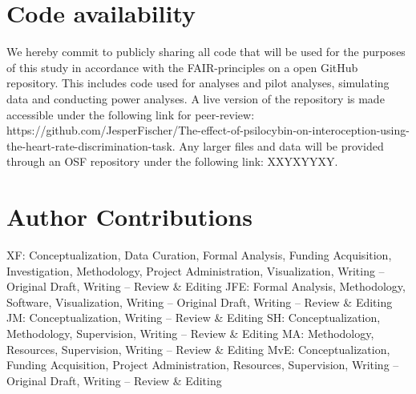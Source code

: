 \documentclass{article}
\begin{document}
\section{Code availability}
\begin{comment}
    For Registered Reports, public sharing of all code upon acceptance for publication of the Stage 2 manuscript is mandatory. Please include a statement committing to sharing all code on acceptance of your Stage 2 manuscript. The Code availability statement must be included separately from the Data availability statement. Please provide a link (e.g. GitHub, osf) to a live version of your code. Code used to simulate data, conduct power analyses, and analyse pilot data should be made accessible in the same location. The code must be made available for peer-review, but can be placed under public embargo until Stage 2 acceptance.
\end{comment}
We hereby commit to publicly sharing all code that will be used for the purposes of this study in accordance with the FAIR-principles on a open GitHub repository. This includes code used for analyses and pilot analyses, simulating data and conducting power analyses. A live version of the repository is made accessible under the following link for peer-review: https://github.com/JesperFischer/The-effect-of-psilocybin-on-interoception-using-the-heart-rate-discrimination-task. Any larger files and data will be provided through an OSF repository under the following link: XXYXYYXY.

\section{Author Contributions}
XF: Conceptualization, Data Curation, Formal Analysis, Funding Acquisition, Investigation, Methodology, Project Administration, Visualization, Writing – Original Draft, Writing – Review \& Editing
JFE: Formal Analysis, Methodology, Software, Visualization, Writing – Original Draft, Writing – Review \& Editing
JM: Conceptualization, Writing – Review \& Editing
SH: Conceptualization, Methodology, Supervision, Writing – Review \& Editing
MA: Methodology, Resources, Supervision, Writing – Review \& Editing
MvE: Conceptualization, Funding Acquisition, Project Administration, Resources, Supervision, Writing – Original Draft, Writing – Review \& Editing


\printbibliography
\end{document}
